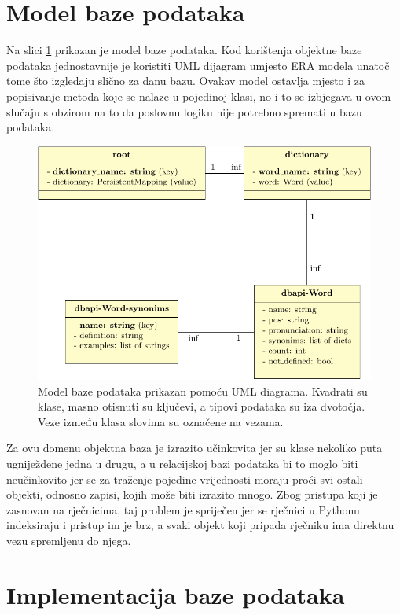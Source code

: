 \documentclass{foi}
\begin{document}
\section{Model baze podataka}

Na slici \ref{uml_db} prikazan je model baze podataka. Kod korištenja objektne
baze podataka jednostavnije je koristiti UML dijagram umjesto ERA modela unatoč
tome što izgledaju slično za danu bazu. Ovakav model ostavlja mjesto i za
popisivanje metoda koje se nalaze u pojedinoj klasi, no i to se izbjegava u
ovom slučaju s obzirom na to da poslovnu logiku nije potrebno spremati u bazu
podataka.

\begin{figure}[!h]
\centering
\includegraphics[scale=1]{uml_db.pdf}
\caption{Model baze podataka prikazan pomoću UML diagrama. Kvadrati su
	klase, masno otisnuti su ključevi, a tipovi podataka su iza dvotočja.
	Veze između klasa slovima su označene na vezama.}
\label{uml_db}
\end{figure}

Za ovu domenu objektna baza je izrazito učinkovita jer su klase nekoliko puta
ugniježđene jedna u drugu, a u relacijskoj bazi podataka bi to moglo biti
neučinkovito jer se za traženje pojedine vrijednosti moraju proći svi ostali
objekti, odnosno zapisi, kojih može biti izrazito mnogo. Zbog pristupa koji je
zasnovan na rječnicima, taj problem je spriječen jer se rječnici u Pythonu
indeksiraju i pristup im je brz, a svaki objekt koji pripada rječniku ima
direktnu vezu spremljenu do njega.

\section{Implementacija baze podataka}
\end{document}
